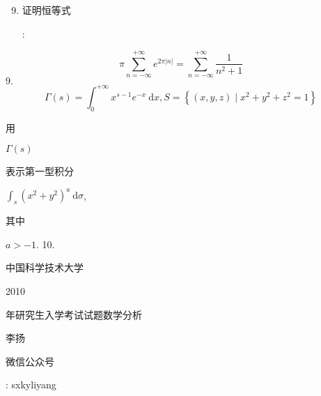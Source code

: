\documentclass[10pt]{article}
\begin{document}
\begin{enumerate}
  \setcounter{enumi}{8}
  \item \begin{CJK}{UTF8}{mj}证明恒等式\end{CJK}:
\end{enumerate}
$$
\pi \sum_{n=-\infty}^{+\infty} e^{2 \pi|n|}=\sum_{n=-\infty}^{+\infty} \frac{1}{n^{2}+1}
$$
$9 .$
$$
\Gamma(s)=\int_{0}^{+\infty} x^{s-1} e^{-x} \mathrm{~d} x, S=\left\{(x, y, z) \mid x^{2}+y^{2}+z^{2}=1\right\}
$$
\begin{CJK}{UTF8}{mj}用\end{CJK} $\Gamma(s)$ \begin{CJK}{UTF8}{mj}表示第一型积分\end{CJK} $\int_{s}\left(x^{2}+y^{2}\right)^{a} \mathrm{~d} \sigma$, \begin{CJK}{UTF8}{mj}其中\end{CJK} $a>-1$. 10. \begin{CJK}{UTF8}{mj}中国科学技术大学\end{CJK} 2010 \begin{CJK}{UTF8}{mj}年研究生入学考试试题数学分析\end{CJK}

\begin{CJK}{UTF8}{mj}李扬\end{CJK}

\begin{CJK}{UTF8}{mj}微信公众号\end{CJK}: sxkyliyang
\end{document}
